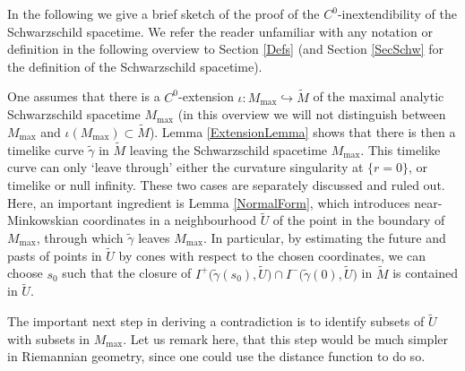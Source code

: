 \documentclass[reqno]{article}
\newcommand{\Mmax}{M_{\mathrm{max}}}
\begin{document}
In the following we give a brief sketch of the proof of the $C^0$-inextendibility of the Schwarzschild spacetime. We refer the reader unfamiliar with any notation or definition in the following overview to Section \ref{Defs} (and Section \ref{SecSchw} for the definition of the Schwarzschild spacetime).

One assumes that there is a $C^0$-extension $\iota : \Mmax \hookrightarrow \tilde{M}$ of the maximal analytic Schwarzschild spacetime $\Mmax$ (in this overview we will not distinguish between $\Mmax$ and $\iota(\Mmax) \subset \tilde{M}$). Lemma \ref{ExtensionLemma} shows that there is then a  timelike curve $\tilde{\gamma}$ in $\tilde{M}$ leaving the Schwarzschild spacetime $\Mmax$. This timelike curve can only `leave through' either the curvature singularity at $\{r=0\}$, or  timelike or null infinity. These two cases are separately discussed and ruled out. Here, an important ingredient is Lemma \ref{NormalForm}, which introduces near-Minkowskian coordinates in a neighbourhood $\tilde{U}$ of the point in the boundary of $\Mmax$, through which $\tilde{\gamma}$ leaves $\Mmax$.  In particular, by estimating the future and pasts of points in $\tilde{U}$ by cones with respect to the chosen coordinates, we can choose $s_0$ such that the closure of $I^+\big(\tilde{\gamma}(s_0), \tilde{U}\big) \cap I^-\big(\tilde{\gamma}(0), \tilde{U}\big)$ in $\tilde{M}$ is contained in $\tilde{U}$. 
\begin{center}
\def\svgwidth{5cm}

\end{center}
The important next step in deriving a contradiction is to identify subsets of $\tilde{U}$ with subsets in $\Mmax$. Let us remark here, that this step would be much simpler in Riemannian geometry, since one could use the distance function to do so.
\end{document}
